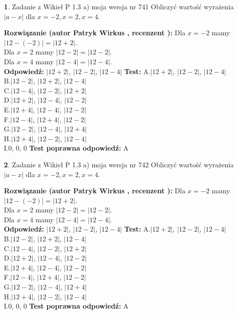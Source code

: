\documentclass[12pt, a4paper]{article}
\theoremstyle{definition} %
\newtheorem{zad}{}
\newcommand{\zadStart}[1]{\begin{zad}#1\newline}
\newcommand{\zadStop}{\end{zad}}
\newcommand{\rozwStart}[2]{\noindent \textbf{Rozwiązanie (autor #1 , recenzent #2): }\newline}
\newcommand{\rozwStop}{\newline}
\newcommand{\odpStart}{\noindent \textbf{Odpowiedź:}\newline}
\newcommand{\odpStop}{\newline}
\newcommand{\testStart}{\noindent \textbf{Test:}\newline}
\newcommand{\testStop}{\newline}
\newcommand{\kluczStart}{\noindent \textbf{Test poprawna odpowiedź:}\newline}
\newcommand{\kluczStop}{\newline}
\begin{document}
\zadStart{Zadanie z Wikieł P 1.3 a) moja wersja nr 741}
Obliczyć wartość wyrażenia $|a - x|$ dla $x=-2,x=2,x=4$.
\zadStop
\rozwStart{Patryk Wirkus}{}
Dla $x = -2$ mamy $|12 - (-2)| = |12 + 2|$.\\
Dla $x = 2$ mamy $|12 - 2| = |12 - 2|$.\\
Dla $x = 4$ mamy $|12 - 4| = |12 - 4|$.\\
\rozwStop
\odpStart
$|12 + 2|$, $|12 - 2|$, $|12 - 4|$
\odpStop
\testStart
A.$|12 + 2|$, $|12 - 2|$, $|12 - 4|$\\
B.$|12 - 2|$, $|12 + 2|$, $|12 - 4|$\\
C.$|12 - 4|$, $|12 - 2|$, $|12 + 2|$\\
D.$|12 + 2|$, $|12 - 4|$, $|12 - 2|$\\
E.$|12 + 4|$, $|12 - 4|$, $|12 - 2|$\\
F.$|12 - 4|$, $|12 + 4|$, $|12 - 2|$\\
G.$|12 - 2|$, $|12 - 4|$, $|12 + 4|$\\
H.$|12 + 4|$, $|12 - 2|$, $|12 - 4|$\\
I.$0$, $0$, $0$
\testStop
\kluczStart
A
\kluczStop



\zadStart{Zadanie z Wikieł P 1.3 a) moja wersja nr 742}
Obliczyć wartość wyrażenia $|a - x|$ dla $x=-2,x=2,x=4$.
\zadStop
\rozwStart{Patryk Wirkus}{}
Dla $x = -2$ mamy $|12 - (-2)| = |12 + 2|$.\\
Dla $x = 2$ mamy $|12 - 2| = |12 - 2|$.\\
Dla $x = 4$ mamy $|12 - 4| = |12 - 4|$.\\
\rozwStop
\odpStart
$|12 + 2|$, $|12 - 2|$, $|12 - 4|$
\odpStop
\testStart
A.$|12 + 2|$, $|12 - 2|$, $|12 - 4|$\\
B.$|12 - 2|$, $|12 + 2|$, $|12 - 4|$\\
C.$|12 - 4|$, $|12 - 2|$, $|12 + 2|$\\
D.$|12 + 2|$, $|12 - 4|$, $|12 - 2|$\\
E.$|12 + 4|$, $|12 - 4|$, $|12 - 2|$\\
F.$|12 - 4|$, $|12 + 4|$, $|12 - 2|$\\
G.$|12 - 2|$, $|12 - 4|$, $|12 + 4|$\\
H.$|12 + 4|$, $|12 - 2|$, $|12 - 4|$\\
I.$0$, $0$, $0$
\testStop
\kluczStart
A
\kluczStop
\end{document}
